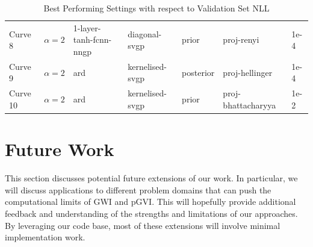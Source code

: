 \documentclass{article}
\def\code#1{\texttt{#1}}
\numberwithin{equation}{section}
\begin{document}
\begin{table}[h!]
\begin{tabular}{lllllll}
 Curve 8  &                       $\alpha=2$ &                1-layer-tanh-fcnn-nngp &          diagonal-svgp &          prior &         proj-renyi &      1e-4 \\
 Curve 9  &                       $\alpha=2$ &                                  ard &        kernelised-svgp &      posterior &     proj-hellinger &      1e-4 \\
 Curve 10 &                       $\alpha=2$ &                                  ard &        kernelised-svgp &          prior & proj-bhattacharyya &      1e-2 \\
\bottomrule
\end{tabular}
\caption{Best Performing Settings with respect to Validation Set NLL}
\label{table:toy-curve-configs}
\end{table}


\newpage
\section{Future Work}\label{section:future-work}
This section discusses potential future extensions of our work. 
In particular, we will discuss applications to different problem domains that can push the computational limits of GWI and pGVI. 
This will hopefully provide additional feedback and understanding of the strengths and limitations of our approaches.
By leveraging our code base, most of these extensions will involve minimal implementation work.

\end{document}
